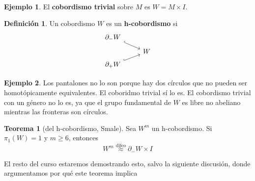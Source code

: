 \documentclass[spanish]{book}
\theoremstyle{definition}
\newtheorem*{defn}{Definición}
\newtheorem*{teo}{Teorema}
\newtheorem*{ejem}{Ejemplo}
\begin{document}
\begin{ejem}
	El \textbf{cobordismo trivial} sobre $M$ es $W=M\times I$.
\end{ejem}

\begin{defn}
	Un cobordismo $W$ es un \textbf{h-cobordismo} si
	\[\begin{tikzcd}[row sep=tiny]
		\partial_-W\arrow[dr,hook]\\
		&W\\
		\partial_+W\arrow[ur,hook]
	\end{tikzcd}\]
\end{defn}
\begin{ejem}
	Los pantalones no lo son porque hay dos círculos que no pueden ser homotópicamente equivalentes. El coboridmo trivial sí lo es. El cobordismo trivial con un género no lo es, ya que el grupo fundamental de $W$ es libre no abeliano mientras las fronteras son círculos.
\end{ejem}

\begin{teo}[del h-cobordismo, Smale]
	Sea $W^m$ un h-cobordismo. Si $\pi_1(W)=1$ y $m\geq6$, entonces
	\[W^m\overset{\text{difeo}}{\approx}\partial_-W\times I\]
\end{teo}
El resto del curso estaremos demostrando esto, salvo la siguiente discusión, donde argumentamos por qué este teorema implica
\end{document}
